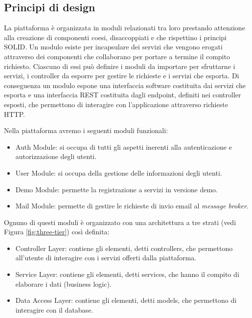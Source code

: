 \subsection{Principi di design}
La piattaforma è organizzata in moduli relazionati tra loro prestando attenzione
alla creazione di componenti coesi, disaccoppiati e che rispettino i principi SOLID.
Un modulo esiste per incapsulare dei servizi che vengono erogati attraverso dei componenti
che collaborano per portare a termine il compito richiesto. Ciascuno di essi può definire i moduli da importare per sfruttarne i servizi, i controller da esporre per gestire le richieste e i servizi che esporta.
Di conseguenza un modulo espone una interfaccia software costituita dai servizi che esporta e una interfaccia REST costituita dagli endpoint, definiti nei controller esposti,
che permettono di interagire con l'applicazione attraverso richieste HTTP.

Nella piattaforma avremo i seguenti moduli funzionali:
\begin{itemize}
    \itemsep0em
    \item Auth Module: si occupa di tutti gli aspetti inerenti alla autenticazione e autorizzazione degli utenti.
    \item User Module: si occupa della gestione delle informazioni degli utenti.
    \item Demo Module: permette la registrazione a servizi in versione demo.
    \item Mail Module: permette di gestire le richieste di invio email al \textit{message broker}.
\end{itemize}
Ognuno di questi moduli è organizzato con una architettura a tre strati (vedi Figura \ref{fig:three-tier}) così definita:
\begin{itemize}
    \itemsep0em
    \item Controller Layer: contiene gli elementi, detti controllers, che permettono all'utente di interagire con i servizi offerti dalla piattaforma.
    \item Service Layer: contiene gli elementi, detti services, che hanno il compito di elaborare i dati (business logic).
    \item Data Access Layer: contiene gli elementi, detti models, che permettono di interagire con il database.
\end{itemize}

